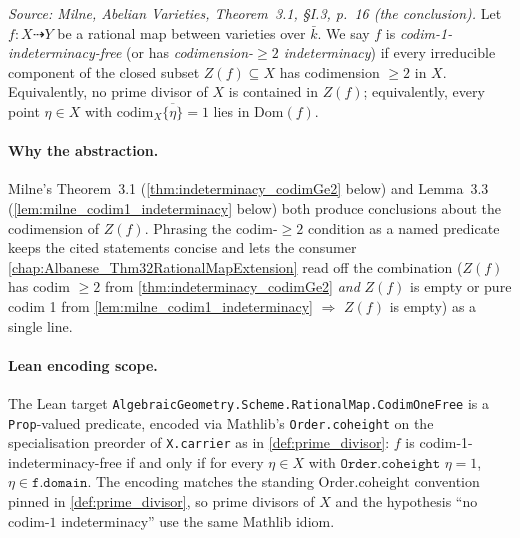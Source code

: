 \begin{definition}


  \label{def:codim_one_indeterminacy}
  \textit{Source: Milne, \emph{Abelian Varieties}, Theorem~3.1, \S I.3, p.~16 (the
  conclusion).}
  Let \(f \colon X \dashrightarrow Y\) be a rational map between varieties over \(\bar k\).
  We say \(f\) is \emph{codim-1-indeterminacy-free} (or has \emph{codimension-\(\geq 2\)
  indeterminacy}) if every irreducible component of the closed subset \(Z(f) \subseteq X\)
  has codimension \(\geq 2\) in \(X\). Equivalently, no prime divisor of \(X\) is contained in
  \(Z(f)\); equivalently, every point \(\eta \in X\) with \(\mathrm{codim}_X \overline{\{\eta\}} = 1\)
  lies in \(\mathrm{Dom}(f)\).

  \paragraph{Why the abstraction.} Milne's Theorem~3.1 (\cref{thm:indeterminacy_codimGe2}
  below) and Lemma~3.3 (\cref{lem:milne_codim1_indeterminacy} below) both produce
  conclusions about the codimension of \(Z(f)\). Phrasing the codim-\(\geq 2\) condition
  as a named predicate keeps the cited statements concise and lets the consumer
  \cref{chap:Albanese_Thm32RationalMapExtension} read off the combination
  (\(Z(f)\) has codim \(\geq 2\) from \cref{thm:indeterminacy_codimGe2} \emph{and} \(Z(f)\) is
  empty or pure codim 1 from \cref{lem:milne_codim1_indeterminacy} \(\Rightarrow\) \(Z(f)\)
  is empty) as a single line.

  \paragraph{Lean encoding scope.} The Lean target
  \texttt{AlgebraicGeometry.Scheme.RationalMap.CodimOneFree} is a \texttt{Prop}-valued
  predicate, encoded via Mathlib's \texttt{Order.coheight} on the specialisation
  preorder of \texttt{X.carrier} as in
  \cref{def:prime_divisor}: \(f\) is codim-1-indeterminacy-free if and only if for every
  \(\eta \in X\) with \(\texttt{Order.coheight\ }\eta = 1\), \(\eta \in
  \texttt{f.domain}\). The encoding matches the standing \(\mathrm{Order.coheight}\)
  convention pinned in \cref{def:prime_divisor}, so prime divisors of \(X\) and the
  hypothesis ``no codim-\(1\) indeterminacy'' use the same Mathlib idiom.
\end{definition}

